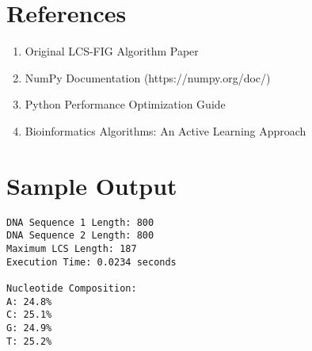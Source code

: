 \documentclass[12pt]{article}
\begin{document}
\section{References}

\begin{enumerate}
    \item Original LCS-FIG Algorithm Paper
    \item NumPy Documentation (https://numpy.org/doc/)
    \item Python Performance Optimization Guide
    \item Bioinformatics Algorithms: An Active Learning Approach
\end{enumerate}

\appendix
\section{Sample Output}

\begin{lstlisting}[caption=Sample Output for n=800, K=10]
DNA Sequence 1 Length: 800
DNA Sequence 2 Length: 800
Maximum LCS Length: 187
Execution Time: 0.0234 seconds

Nucleotide Composition:
A: 24.8%
C: 25.1%
G: 24.9%
T: 25.2%
\end{lstlisting}
\end{document}
